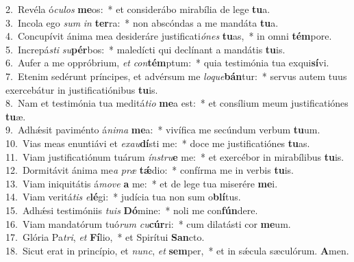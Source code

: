 {2.~}Revéla ó\textit{cu}\textit{los} \textbf{me}os:~* et considerábo mirabília de lege \textbf{tu}a.\\
{3.~}Incola ego \textit{sum} \textit{in} \textbf{ter}ra:~* non abscóndas a me mandáta \textbf{tu}a.\\
{4.~}Concupívit ánima mea desideráre justificati\textit{ó}\textit{nes} \textbf{tu}as,~* in omni \textbf{tém}pore.\\
{5.~}Increpá\textit{sti} \textit{su}\textbf{pér}bos:~* maledícti qui declínant a mandátis \textbf{tu}is.\\
{6.~}Aufer a me oppróbrium, \textit{et} \textit{con}\textbf{tém}ptum:~* quia testimónia tua exqui\textbf{sí}vi.\\
{7.~}Etenim sedérunt príncipes, et advérsum me \textit{lo}\textit{que}\textbf{bán}tur:~* servus autem tuus exercebátur in justificatiónibus \textbf{tu}is.\\
{8.~}Nam et testimónia tua meditá\textit{ti}\textit{o} \textbf{me}a est:~* et consílium meum justificatiónes \textbf{tu}æ.\\
{9.~}Adhǽsit paviménto á\textit{ni}\textit{ma} \textbf{me}a:~* vivífica me secúndum verbum \textbf{tu}um.\\
{10.~}Vias meas enuntiávi et \textit{e}\textit{xau}\textbf{dí}sti me:~* doce me justificatiónes \textbf{tu}as.\\
{11.~}Viam justificatiónum tuárum \textit{ín}\textit{stru}\textbf{e} me:~* et exercébor in mirabílibus \textbf{tu}is.\\
{12.~}Dormitávit ánima me\textit{a} \textit{præ} \textbf{tǽ}dio:~* confírma me in verbis \textbf{tu}is.\\
{13.~}Viam iniquitátis á\textit{mo}\textit{ve} \textbf{a} me:~* et de lege tua miserére \textbf{me}i.\\
{14.~}Viam veritá\textit{tis} \textit{e}\textbf{lé}gi:~* judícia tua non sum o\textbf{blí}tus.\\
{15.~}Adhǽsi testimóniis \textit{tu}\textit{is} \textbf{Dó}mine:~* noli me con\textbf{fún}dere.\\
{16.~}Viam mandatórum tuó\textit{rum} \textit{cu}\textbf{cúr}ri:~* cum dilatásti cor \textbf{me}um.\\
{17.~}Glória Pa\textit{tri}, \textit{et} \textbf{Fí}lio,~* et Spirítui \textbf{San}cto.\\
{18.~}Sicut erat in princípio, et \textit{nunc}, \textit{et} \textbf{sem}per,~* et in sǽcula sæculórum. \textbf{A}men.\\

